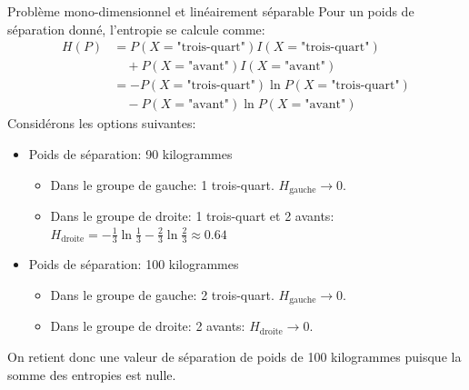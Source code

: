 \begin{frame}{Problème mono-dimensionnel et linéairement séparable}
	Pour un poids de séparation donné, l'entropie se calcule comme:
	\begin{align*}
		H(P) &= P(X = \text{"trois-quart"}) I(X = \text{"trois-quart"}) \\
		&\quad + P(X = \text{"avant"}) I(X = \text{"avant"}) \\
		&= - P(X = \text{"trois-quart"}) \ln P(X = \text{"trois-quart"}) \\
		&\quad - P(X = \text{"avant"}) \ln P(X = \text{"avant"})
	\end{align*}
	Considérons les options suivantes:
	\begin{itemize}
		\item Poids de séparation: 90 kilogrammes
		\begin{itemize}
			\item Dans le groupe de gauche: 1 trois-quart. $H_{\text{gauche}} \to 0$.
			\item Dans le groupe de droite: 1 trois-quart et 2 avants: $H_{\text{droite}} = - \frac{1}{3} \ln \frac{1}{3} - \frac{2}{3} \ln \frac{2}{3} \approx 0.64$
		\end{itemize}
		\pause
		\item Poids de séparation: 100 kilogrammes
		\begin{itemize}
			\item Dans le groupe de gauche: 2 trois-quart. $H_{\text{gauche}} \to 0$.
			\item Dans le groupe de droite: 2 avants: $H_{\text{droite}} \to 0$.
		\end{itemize}		
	\end{itemize}
	\pause
	On retient donc une valeur de séparation de poids de 100 kilogrammes puisque la somme des entropies est nulle.
\end{frame}

